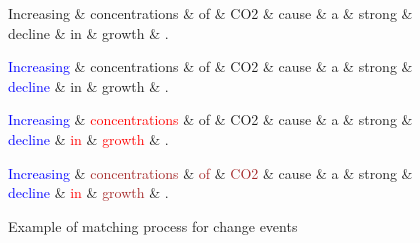 \begin{figure}
\begin{center}
\begin{dependency}[theme = simple]
	\begin{deptext}
	Increasing \& concentrations \& of \& CO2 \& cause \& a \& strong \& decline \& in \& growth \& . \\
	\end{deptext}
\end{dependency}

\begin{dependency}[theme = simple]
	\begin{deptext}
	\textcolor{blue}{Increasing} \& concentrations \& of \& CO2 \& cause \& a \& strong \& \textcolor{blue}{decline} \& in \& growth \& . \\
	\end{deptext}
\end{dependency}

\begin{dependency}[theme = simple]
	\begin{deptext}
	\textcolor{blue}{Increasing} \& \textcolor{red}{concentrations} \& of \& CO2 \& cause \& a \& strong \& \textcolor{blue}{decline} \& \textcolor{red}{in} \& \textcolor{red}{growth} \& . \\
	\end{deptext}
\end{dependency}

\begin{dependency}[theme = simple]
	\begin{deptext}
	\textcolor{blue}{Increasing} \& \textcolor{brown}{concentrations} \& \textcolor{brown}{of} \& \textcolor{brown}{CO2} \& cause \& a \& strong \& \textcolor{blue}{decline} \& \textcolor{red}{in} \& \textcolor{brown}{growth} \& . \\
	\end{deptext}
\end{dependency}

\end{center}
\caption{Example of matching process for change events}
\label{dep_pattern}
\end{figure}

